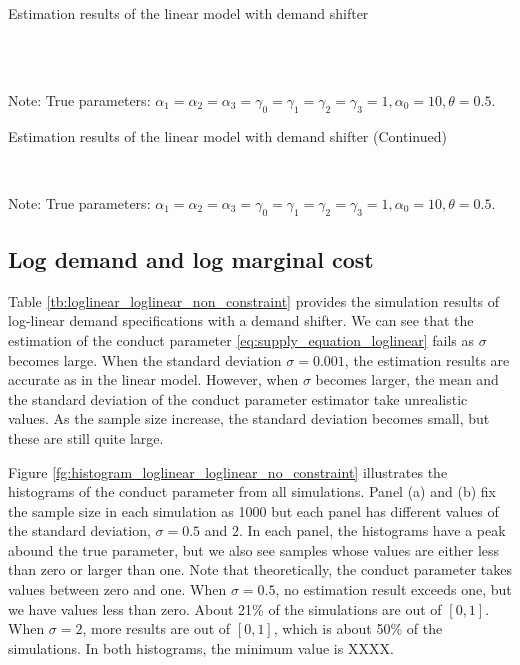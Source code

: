 \documentclass[11pt, a4paper]{article}
\begin{document}
\begin{table}[!htbp]
  \begin{center}
      \caption{Estimation results of the linear model with demand shifter}
      \label{tb:linear_linear_sigma_1} 
      \subfloat[$\sigma=0.001$]{}\\
      \subfloat[$\sigma=0.5$]{}\\
  \end{center}\footnotesize
  Note: True parameters: $\alpha_1 = \alpha_2 = \alpha_3 = \gamma_0 = \gamma_1 = \gamma_2  = \gamma_3 = 1, \alpha_0 = 10, \theta = 0.5.$
\end{table} 

\begin{table}[!htbp]
  \ContinuedFloat  %
  \begin{center}
      \caption{Estimation results of the linear model with demand shifter (Continued)}
      \label{tb:linear_linear_sigma_1} 
      \subfloat[$\sigma=1.0$]{}\\
    \subfloat[$\sigma=2.0$]{}
  \end{center}\footnotesize
  Note: True parameters: $\alpha_1 = \alpha_2 = \alpha_3 = \gamma_0 = \gamma_1 = \gamma_2  = \gamma_3 = 1, \alpha_0 = 10, \theta = 0.5.$
\end{table} 


\subsection{Log demand and log marginal cost}
Table \ref{tb:loglinear_loglinear_non_constraint} provides the simulation results of log-linear demand specifications with a demand shifter. 
We can see that the estimation of the conduct parameter \eqref{eq:supply_equation_loglinear} fails as $\sigma$ becomes large. 
When the standard deviation $\sigma = 0.001$, the estimation results are accurate as in the linear model.
However, when $\sigma$ becomes larger, the mean and the standard deviation of the conduct parameter estimator take unrealistic values.
As the sample size increase, the standard deviation becomes small, but these are still quite large.

Figure \ref{fg:histogram_loglinear_loglinear_no_constraint} illustrates the histograms of the conduct parameter from all simulations.
Panel (a) and (b) fix the sample size in each simulation as 1000 but each panel has different values of the standard deviation, $\sigma = 0.5$ and $2$.
In each panel, the histograms have a peak abound the true parameter, but we also see samples whose values are either less than zero or larger than one.
Note that theoretically, the conduct parameter takes values between zero and one.
When $\sigma = 0.5$, no estimation result exceeds one, but we have values less than zero.
About 21\% of the simulations are out of $[0,1]$.
When $\sigma = 2$, more results are out of $[0,1]$, which is about 50\% of the simulations.
In both histograms, the minimum value is XXXX.
\end{document}
